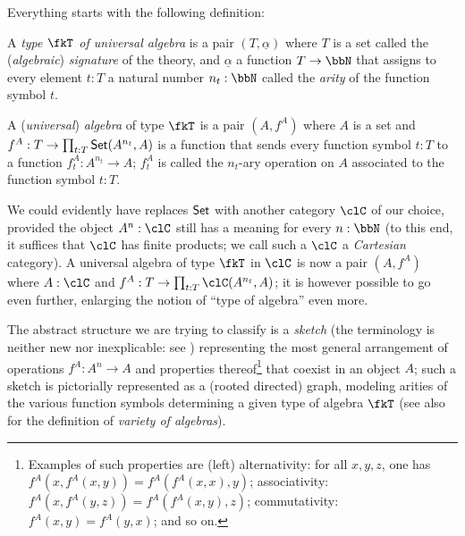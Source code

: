 Everything starts with the following definition:
\begin{definition}\label{unialg}
    A \emph{type $\fkT$ of universal algebra} is a pair $(T,\underline{\alpha})$ where $T$ is a set called the (\emph{algebraic}) \emph{signature} of the theory, and $\underline\alpha$ a function $T \to \bbN$ that assigns to every element $t: T$ a natural number $n_t: \bbN$ called the \emph{arity} of the function symbol $t$.
\end{definition}
\begin{definition}
    A (\emph{universal}) \emph{algebra} of type $\fkT$ is a pair $(A,f^A)$ where $A$ is a set and $f^A: T \to \prod_{t: T} \mathsf{Set}(A^{n_t},A )$ is a function that sends every function symbol $t: T$ to a function $f^A_t: A^{n_t} \to A$; $f^A_t$ is called the $n_t$-ary operation on $A$ associated to the function symbol $t: T$.
\end{definition}
We could evidently have replaces $\mathsf{Set}$ with another category $\clC$ of our choice, provided the object $A^n: \clC$ still has a meaning for every $n: \bbN$ (to this end, it suffices that $\clC$ has finite products; we call such a $\clC$ a \emph{Cartesian} category). A universal algebra of type $\fkT$ in $\clC$ is now a pair $(A,f^A)$ where $A: \clC$ and $f^A: T \to \prod_{t: T} \clC(A^{n_t},A )$; it is however possible to go even further, enlarging the notion of ``type of algebra'' even more.

The abstract structure we are trying to classify is a \emph{sketch} (the terminology is neither new nor inexplicable: see \cite{ehresmann1968esquisses,coppey1984leccons, Bor2}) representing the most general arrangement of operations $f^A: A^n \to A$ and properties thereof\footnote{Examples of such properties are (left) alternativity: for all $x,y,z$, one has $f^A(x,f^A(x,y)) = f^A(f^A(x,x),y)$; associativity: $f^A(x,f^A(y,z)) = f^A(f^A(x,y),z)$; commutativity: $f^A(x,y)=f^A(y,x)$; and so on.} that coexist in an object $A$; such a sketch is pictorially represented as a (rooted directed) graph, modeling arities of the various function symbols determining a given type of algebra $\fkT$ (see also \cite[XV.3]{grillet2007abstract} for the definition of \emph{variety of algebras}).


